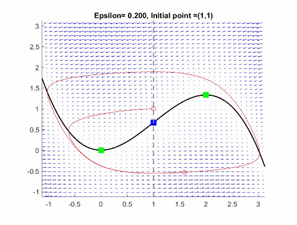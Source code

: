 \documentclass[25pt, a0paper, portrait]{tikzposter}
\begin{document}
\begin{columns}
{
\begin{tikzfigure}[h!]
	\centering
	\includegraphics[height=20cm,width=26cm]{Posterpic1.jpg}
\end{tikzfigure}
}
{
\begin{tikzfigure}[h!]
	\centering

\end{tikzfigure}}
\end{columns}
\end{document}
